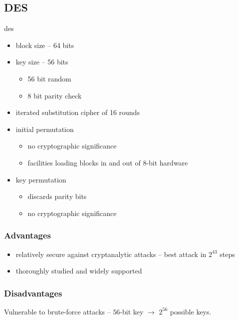\documentclass[draft]{article}
\begin{document}
\subsection{DES}
\acrfull{des}
\begin{multicols}{2}
    \begin{itemize}[nosep]
        \item block size -- 64 bits
        \item key size -- 56 bits
              \begin{itemize}[nosep]
                  \item 56 bit random
                  \item 8 bit parity check
              \end{itemize}
        \item iterated substitution cipher of 16 rounds
        \item initial permutation
              \begin{itemize}[nosep]
                  \item no cryptographic significance
                  \item facilities loading blocks in and out of 8-bit hardware
              \end{itemize}
        \item key permutation
              \begin{itemize}[nosep]
                  \item discards parity bits
                  \item no cryptographic significance
              \end{itemize}
    \end{itemize}
    \subsubsection*{Advantages}
    \begin{itemize}[nosep]
        \item relatively secure against cryptanalytic attacks -- best attack in $2^{43}$ steps
        \item thoroughly studied and widely supported
    \end{itemize}
    \subsubsection*{Disadvantages}
    Vulnerable to \glspl{brute-force attack} -- $56$-bit key $\rightarrow$ $2^{56}$ possible keys.


\end{multicols}
\end{document}
